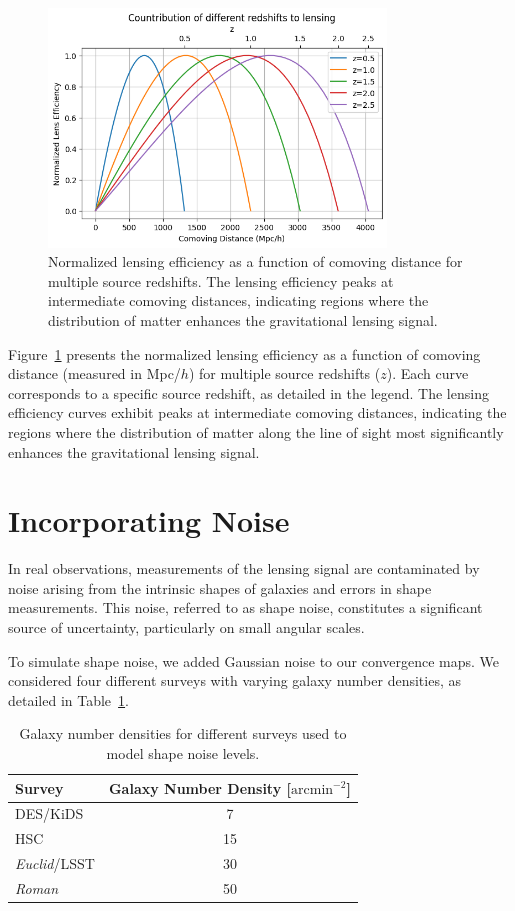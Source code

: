 \begin{figure}
    \centering
    \includegraphics[width=0.8\textwidth]{figures/lensefficiency.png}
    \caption{Normalized lensing efficiency as a function of comoving distance for multiple source redshifts. The lensing efficiency peaks at intermediate comoving distances, indicating regions where the distribution of matter enhances the gravitational lensing signal.} \label{fig:lensing_efficiency}
\end{figure}
Figure~\ref{fig:lensing_efficiency} presents the normalized lensing efficiency as a function of comoving distance (measured in Mpc/$h$) for multiple source redshifts ($z$). Each curve corresponds to a specific source redshift, as detailed in the legend. The lensing efficiency curves exhibit peaks at intermediate comoving distances, indicating the regions where the distribution of matter along the line of sight most significantly enhances the gravitational lensing signal. 

\section{Incorporating Noise}
In real observations, measurements of the lensing signal are contaminated by noise arising from the intrinsic shapes of galaxies and errors in shape measurements. This noise, referred to as shape noise, constitutes a significant source of uncertainty, particularly on small angular scales.

To simulate shape noise, we added Gaussian noise to our convergence maps. We considered four different surveys with varying galaxy number densities, as detailed in Table~\ref{tab:noise}.

\begin{table}[h]
\centering
\begin{tabular}{lc}
\toprule
\textbf{Survey} & \textbf{Galaxy Number Density} [$\mathrm{arcmin}^{-2}$] \\
\midrule
DES/KiDS & 7 \\
HSC & 15 \\
\textit{Euclid}/LSST & 30 \\
\textit{Roman} & 50 \\
\bottomrule
\end{tabular}
\caption{Galaxy number densities for different surveys used to model shape noise levels.}\label{tab:noise}
\end{table}

